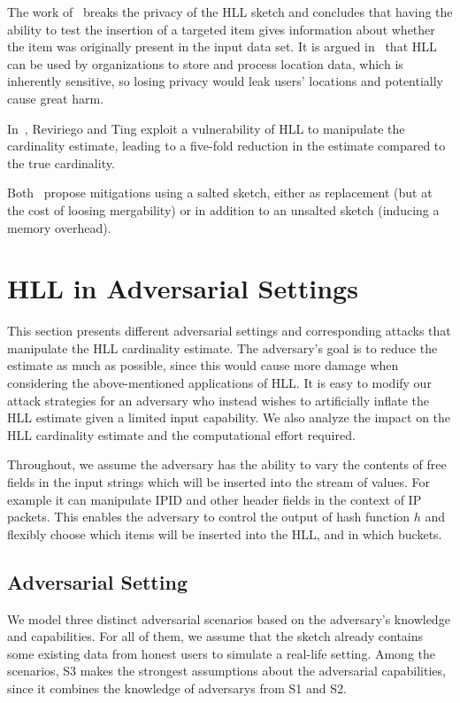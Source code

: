 \documentclass{IEEEtran}
\newcommand{\kenny}[2][inline]{\todo[#1]{\textbf{Kenny:} #2}\xspace}
\begin{document}
The work of~\cite{cardestprivacy} breaks the privacy of the HLL sketch and concludes that having the ability to test the insertion \kenny{what does this mean?} of a targeted item gives information about whether the item was originally present in the input data set. It is argued in~\cite{cardestprivacy} that HLL can be used by organizations to store and process location data, which is inherently sensitive, so losing privacy would leak users' locations and potentially cause great harm. 

In~\cite{hllvuln}, Reviriego and Ting exploit a vulnerability of HLL to manipulate the cardinality estimate, leading to a five-fold reduction in the estimate compared to the true cardinality.

Both~\cite{cardestprivacy,hllvuln} propose mitigations using a salted sketch, either as replacement (but at the cost of loosing mergability) or in addition to an unsalted sketch (inducing a memory overhead). 

\section{HLL in Adversarial Settings}\label{sec:attacks}

This section presents different adversarial settings and corresponding attacks that manipulate the HLL cardinality estimate. The adversary's goal is to reduce the estimate as much as possible, since this would cause more damage when  considering the above-mentioned applications of HLL. It is easy to modify our attack strategies for an adversary who instead wishes to artificially inflate the HLL estimate given a limited input capability. We also analyze the impact on the HLL cardinality estimate and the computational effort required. 

Throughout, we assume the adversary has the ability to vary the contents of free fields in the input strings which will be inserted into the stream of values. For example it can manipulate IPID and other header fields in the context of IP packets. This enables the adversary to control the output of hash function $h$ and flexibly choose which items will be inserted into the HLL, and in which buckets.

\subsection{Adversarial Setting}
We model three distinct adversarial scenarios based on the adversary's knowledge and capabilities. For all of them, we assume that the sketch already contains some existing data from honest users to simulate a real-life setting. Among the scenarios, S3 makes the strongest assumptions about the adversarial capabilities, since it combines the knowledge of adversarys from S1 and S2.
\end{document}
